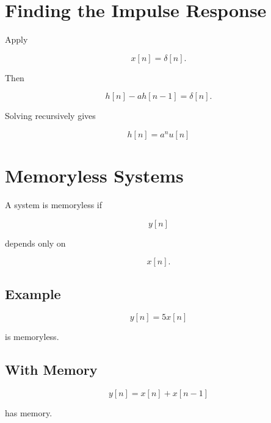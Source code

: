
\section{Finding the Impulse Response}

Apply

\[
x[n]=\delta[n].
\]

Then

\[
h[n]-ah[n-1]=\delta[n].
\]

Solving recursively gives

\[
\boxed{
h[n]=a^n u[n]
}
\]


\section{Memoryless Systems}

A system is memoryless if

\[
y[n]
\]

depends only on

\[
x[n].
\]


\subsection{Example}

\[
y[n]=5x[n]
\]

is memoryless.


\subsection{With Memory}

\[
y[n]=x[n]+x[n-1]
\]

has memory.


